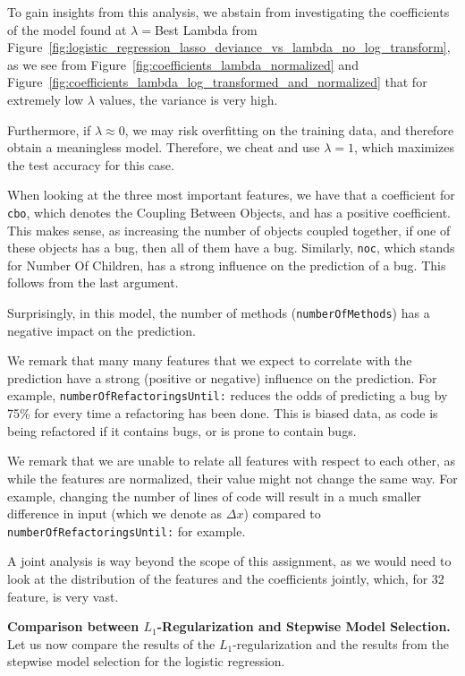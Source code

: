 To gain insights from this analysis, we abstain from investigating the coefficients of the model found at $\lambda=$Best Lambda from Figure~\ref{fig:logistic_regression_lasso_deviance_vs_lambda_no_log_transform}, as we see from Figure~\ref{fig:coefficients_lambda_normalized} and Figure~\ref{fig:coefficients_lambda_log_transformed_and_normalized} that for extremely low $\lambda$ values, the variance is very high.

Furthermore, if $\lambda\approx 0$, we may risk overfitting on the training data, and therefore obtain a meaningless model.
Therefore, we cheat and use $\lambda = 1$, which maximizes the test accuracy for this case.


When looking at the three most important features, we have that a coefficient for \texttt{cbo}, which denotes the Coupling Between Objects, and has a positive coefficient. This makes sense, as increasing the number of objects coupled together, if one of these objects has a bug, then all of them have a bug.
Similarly, \texttt{noc}, which stands for Number Of Children, has a strong influence on the prediction of a bug. This follows from the last argument.

Surprisingly, in this model, the number of methods (\texttt{numberOfMethods}) has a negative impact on the prediction. 

We remark that many many features that we expect to correlate with the prediction have a strong (positive or negative) influence on the prediction. For example, \texttt{numberOfRefactoringsUntil:} reduces the odds of predicting a bug by 75\% for every time a refactoring has been done. This is biased data, as code is being refactored if it contains bugs, or is prone to contain bugs.

We remark that we are unable to relate all features with respect to each other, as while the features are normalized, their value might not change the same way. For example, changing the number of lines of code will result in a much smaller difference in input (which we denote as $\Delta x$) compared to \texttt{numberOfRefactoringsUntil:} for example.

A joint analysis is way beyond the scope of this assignment, as we would need to look at the distribution of the features and the coefficients jointly, which, for 32 feature, is very vast.

\textbf{Comparison between $L_1$-Regularization and Stepwise Model Selection.}
Let us now compare the results of the $L_1$-regularization and the results from the stepwise model selection for the logistic regression.

